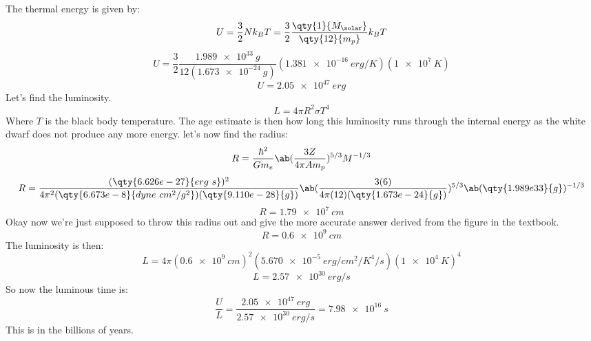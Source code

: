 The thermal energy is given by:
\begin{equation}
    U = \frac{3}{2}N k_B T  = \frac{3}{2}\frac{\qty{1}{M_\solar}}{\qty{12}{m_p}} k_B T
\end{equation}
\begin{equation}
    U = \frac{3}{2}\frac{\qty{1.989e33}{g}}{12(\qty{1.673e-24}{g})} (\qty{1.381e-16}{erg/K})(\qty{1e7}{K})
\end{equation}
\begin{equation}
    \boxed{U = \qty{2.05e47}{erg}}
\end{equation}
Let's find the luminosity.
\begin{equation}
    L = 4\pi R^2 \sigma T^4
\end{equation}
Where $T$ is the black body temperature. The age estimate is then how long this luminosity runs through the internal energy as the white dwarf does not produce any more energy. let's now find the radius:
\begin{equation}
    R = \frac{\hbar^2}{Gm_e}\ab(\frac{3Z}{4\pi A m_p})^{5/3} M^{-1/3}
\end{equation}
\begin{equation}
    R = \frac{(\qty{6.626e-27}{erg\ s})^2}{4\pi^2 (\qty{6.673e-8}{dyne\ cm^2 /g^2})(\qty{9.110e-28}{g})}\ab(\frac{3(6)}{4\pi(12)(\qty{1.673e-24}{g})})^{5/3} \ab(\qty{1.989e33}{g})^{-1/3}
\end{equation}
\begin{equation}
    R = \qty{1.79e7}{cm}
\end{equation}
Okay now we're just supposed to throw this radius out and give the more accurate answer derived from the figure in the textbook.
\begin{equation}
    R = \qty{0.6e9}{cm}
\end{equation}
The luminosity is then:
\begin{equation*}
    L = 4\pi (\qty{0.6e9}{cm})^2 (\qty{5.670e-5}{erg/cm^2/K^4/s}) (\qty{1e4}{K})^4
\end{equation*}
\begin{equation}
    L = \qty{2.57e30}{erg/s}
\end{equation}
So now the luminous time is:
\begin{equation}
    \frac{U}{L} = \frac{\qty{2.05e47}{erg}}{\qty{2.57e30}{erg/s}} = \boxed{\qty{7.98e16}{s}}
\end{equation}
This is in the billions of years.